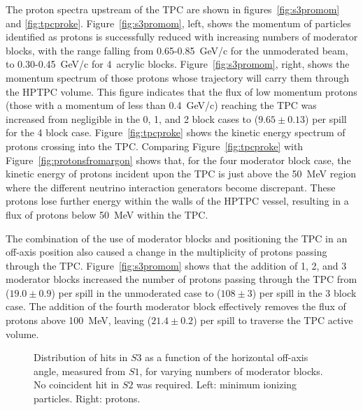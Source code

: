 The proton spectra upstream of the TPC are shown in figures~\ref{fig:s3promom} and \ref{fig:tpcproke}. 
Figure~\ref{fig:s3promom}, left, shows the momentum of particles identified as protons is successfully reduced with increasing numbers of moderator blocks, with the range falling from 0.65-0.85~GeV/c for the unmoderated beam, to 0.30-0.45~GeV/c for 4~acrylic blocks.
Figure~\ref{fig:s3promom}, right, shows the momentum spectrum of those protons whose trajectory will carry them through the HPTPC volume.
This figure indicates that the flux of low momentum protons (those with a momentum of less than 0.4~GeV/c) reaching the TPC was increased from negligible in the 0, 1, and 2 block cases to ($9.65 \pm 0.13$) per spill for the 4 block case.
Figure~\ref{fig:tpcproke} shows the kinetic energy spectrum of protons crossing into the TPC.
Comparing Figure~\ref{fig:tpcproke} with Figure~\ref{fig:protonsfromargon} shows that, for the four moderator block case, the kinetic energy of protons incident upon the TPC is just above the 50~MeV region where the different neutrino interaction generators become discrepant.
These protons lose further energy within the walls of the HPTPC vessel, resulting in a flux of protons below 50~MeV within the TPC.

The combination of the use of moderator blocks and positioning the TPC in an off-axis position also caused a change in the multiplicity of protons passing through the TPC.
Figure~\ref{fig:s3promom} shows that the addition of 1, 2, and 3 moderator blocks increased the number of protons passing through the TPC from ($19.0 \pm 0.9$) per spill in the unmoderated case to ($108 \pm 3$) per spill in the 3 block case.
The addition of the fourth moderator block effectively removes the flux of protons above 100~MeV, leaving ($21.4 \pm 0.2$) per spill to traverse the TPC active volume.
  
\begin{figure}[h]
  \begin{minipage}{0.48\textwidth}
    \begin{adjustbox}{max totalsize={\textwidth}{.35\textheight},center}
      
    \end{adjustbox}
  \end{minipage}
  \hspace{0.3cm}
  \begin{minipage}{0.48\textwidth}
    \begin{adjustbox}{max totalsize={\textwidth}{.35\textheight},center}
      
    \end{adjustbox}
  \end{minipage}
    \caption{\label{fig:s1s3mips}Distribution of hits in $\mathit{S3}$ as a function of the horizontal off-axis angle, measured from $\mathit{S1}$, for varying numbers of moderator blocks. No coincident hit in $\mathit{S2}$ was required. Left: minimum ionizing particles. Right: protons.}
\end{figure}


